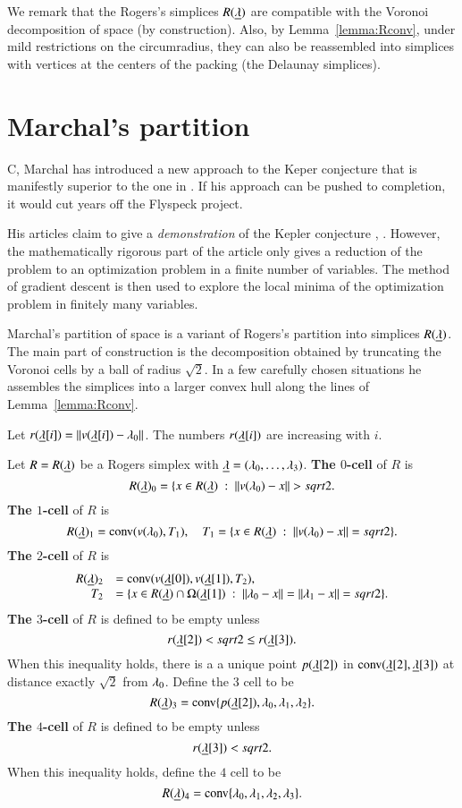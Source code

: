 We remark that the Rogers's simplices $R({\underline{\lambda}})$ are compatible with the Voronoi
decomposition of space (by construction).  Also, by Lemma~\ref{lemma:Rconv}, under
mild restrictions on the circumradius, they can also be reassembled into simplices
with vertices at the centers of the packing (the Delaunay simplices).  

\section{Marchal's partition}

C, Marchal has introduced a new approach to the Keper conjecture that is manifestly superior to the one in \cite{DCG}.  If his approach can be pushed
to completion, it would cut years off the Flyspeck project.

His articles claim to give
a {\it demonstration} of the Kepler conjecture \cite{Mar08}, \cite{Marc07}.  However, the
mathematically rigorous part of the article only gives a reduction
of the problem to an optimization problem in a finite number of
variables.  The method of gradient descent is then used to explore
the local minima of the optimization problem in finitely many variables.

Marchal's partition of space is a variant of Rogers's partition into simplices
$R({\underline{\lambda}})$.  The main part of construction is 
the decomposition obtained by truncating the Voronoi cells
by a ball of radius $\sqrt2$.  In a few carefully chosen situations he assembles the simplices
into a larger convex hull along the lines of Lemma~\ref{lemma:Rconv}.

Let $r({\underline{\lambda}}[i]) = {\|v({\underline{\lambda}}[i])-\lambda_0\|}$.  The numbers $r({\underline{\lambda}}[i])$ are increasing with $i$.

\begin{definition} Let $R=R({\underline{\lambda}})$ be a Rogers simplex with ${\underline{\lambda}}=(\lambda_0,\ldots,\lambda_3)$.
\hfill\break\smallskip  
{\bf The $0$-cell} of $R$ is
$$
R({\underline{\lambda}})_0 = \{x\in R({\underline{\lambda}}) \ :\  {\|v(\lambda_0)-x\|} > sqrt2.
$$
\bigskip
{\bf The $1$-cell} of $R$ is 
$$
R({\underline{\lambda}})_1 = {\operatorname{conv}}(v(\lambda_0),T_1),\quad T_1 = \{x \in R({\underline{\lambda}}) \ :\  {\|v(\lambda_0)-x\|}= sqrt2\}.
$$
\bigskip
{\bf The $2$-cell} of $R$ is
$$
\begin{array}{rll}
R({\underline{\lambda}})_2 &= {\operatorname{conv}}(v({\underline{\lambda}}[0]),v({\underline{\lambda}}[1]),T_2),\quad \\
  T_2 &= \{x \in R({\underline{\lambda}})\cap \Omega({\underline{\lambda}}[1]) \ :\  {\|\lambda_0-x\|}={\|\lambda_1-x\|} =sqrt2\}.
\end{array}
$$
\bigskip
{\bf The $3$-cell} of $R$ is defined to be empty unless 
$$
r({\underline{\lambda}}[2]) <sqrt2 \le r({\underline{\lambda}}[3]).
$$
When this inequality holds,
there is a a unique point $p({\underline{\lambda}}[2])$ in
${\operatorname{conv}}({\underline{\lambda}}[2],{\underline{\lambda}}[3])$ at distance exactly $\sqrt2$ from $\lambda_0$.  
Define the $3$ cell to be
$$
R({\underline{\lambda}})_3 = {\operatorname{conv}}\{p({\underline{\lambda}}[2]),\lambda_0,\lambda_1,\lambda_2\}.
$$
\bigskip
{\bf The $4$-cell} of $R$ is defined to be empty unless
$$
r({\underline{\lambda}}[3]) <sqrt2.
$$
When this inequality holds, define the $4$ cell to be
$$
R({\underline{\lambda}})_4 = {\operatorname{conv}}\{\lambda_0,\lambda_1,\lambda_2,\lambda_3\}.
$$
\end{definition}

